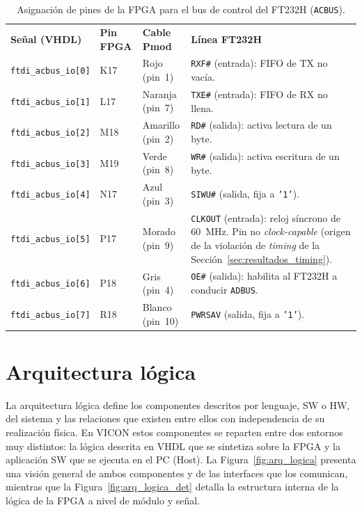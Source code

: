 \documentclass[../main.tex]{subfiles}
\begin{document}
\begin{table}[H]
\centering
\caption{Asignación de pines de la FPGA para el bus de control del FT232H (\texttt{ACBUS}).}
\label{tab:pines_ft232h_acbus}
\begin{tabular}{>{\raggedright\arraybackslash}p{3.4cm}>{\raggedright\arraybackslash}p{2cm}>{\raggedright\arraybackslash}p{2.4cm}>{\raggedright\arraybackslash}p{4.5cm}}
\rowcolor[HTML]{156082}
{\color{white}\textbf{Señal (VHDL)}} & {\color{white}\textbf{Pin FPGA}} & {\color{white}\textbf{Cable Pmod}} & {\color{white}\textbf{Línea FT232H}} \\
\rowcolor[HTML]{C0E6F5}
\texttt{ftdi\_acbus\_io[0]} & K17 & Rojo (pin~1) & \texttt{RXF\#} (entrada): FIFO de TX no vacía. \\
\texttt{ftdi\_acbus\_io[1]} & L17 & Naranja (pin~7) & \texttt{TXE\#} (entrada): FIFO de RX no llena. \\
\rowcolor[HTML]{C0E6F5}
\texttt{ftdi\_acbus\_io[2]} & M18 & Amarillo (pin~2) & \texttt{RD\#} (salida): activa lectura de un byte. \\
\texttt{ftdi\_acbus\_io[3]} & M19 & Verde (pin~8) & \texttt{WR\#} (salida): activa escritura de un byte. \\
\rowcolor[HTML]{C0E6F5}
\texttt{ftdi\_acbus\_io[4]} & N17 & Azul (pin~3) & \texttt{SIWU\#} (salida, fija a \texttt{'1'}). \\
\texttt{ftdi\_acbus\_io[5]} & P17 & Morado (pin~9) & \texttt{CLKOUT} (entrada): reloj síncrono de 60~MHz. Pin no \textit{clock-capable} (origen de la violación de \textit{timing} de la Sección~\ref{sec:resultados_timing}). \\
\rowcolor[HTML]{C0E6F5}
\texttt{ftdi\_acbus\_io[6]} & P18 & Gris (pin~4) & \texttt{OE\#} (salida): habilita al FT232H a conducir \texttt{ADBUS}. \\
\texttt{ftdi\_acbus\_io[7]} & R18 & Blanco (pin~10) & \texttt{PWRSAV} (salida, fija a \texttt{'1'}). \\
\end{tabular}
\end{table}

\FloatBarrier

\section{Arquitectura lógica}
\label{sec:arq_logica}
 
La arquitectura lógica define los componentes descritos por lenguaje, \ac{SW} o \ac{HW}, del sistema y las relaciones que existen entre ellos con independencia de su realización física. En \ac{VICON} estos componentes se reparten entre dos entornos muy distintos: la lógica descrita en \ac{VHDL} que se sintetiza sobre la FPGA y la aplicación \ac{SW} que se ejecuta en el PC (Host). La Figura~\ref{fig:arq_logica} presenta una visión general de ambos componentes y de las interfaces que los comunican, mientras que la Figura~\ref{fig:arq_logica_det} detalla la estructura interna de la lógica de la FPGA a nivel de módulo y señal.
 
\end{document}
